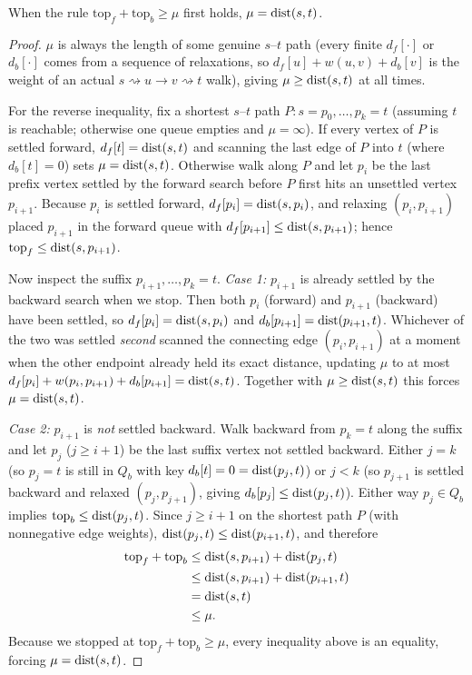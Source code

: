\begin{theorem}
\label{ch08:thm-bidir}
When the rule $\mathrm{top}_f+\mathrm{top}_b\ge\mu$ first holds, $\mu=\operatorname{dist}(s,t)$.
\end{theorem}
\begin{proof}
$\mu$ is always the length of some genuine $s$--$t$ path (every finite $d_f[\cdot]$
or $d_b[\cdot]$ comes from a sequence of relaxations, so $d_f[u]+w(u,v)+d_b[v]$ is
the weight of an actual $s\rightsquigarrow u\to v\rightsquigarrow t$ walk), giving
$\mu\ge\operatorname{dist}(s,t)$ at all times.

For the reverse inequality, fix a shortest $s$--$t$ path
$P: s=p_0,\dots,p_k=t$ (assuming $t$ is reachable; otherwise one queue empties
and $\mu=\infty$). If every vertex of $P$ is settled forward, $d_f[t]=\operatorname{dist}(s,t)$
and scanning the last edge of $P$ into $t$ (where $d_b[t]=0$) sets $\mu=\operatorname{dist}(s,t)$.
Otherwise walk along $P$ and let $p_i$ be the last prefix vertex settled by the
forward search before $P$ first hits an unsettled vertex $p_{i+1}$. Because $p_i$
is settled forward, $d_f[p_i]=\operatorname{dist}(s,p_i)$, and relaxing $(p_i,p_{i+1})$ placed
$p_{i+1}$ in the forward queue with $d_f[p_{i+1}]\le\operatorname{dist}(s,p_{i+1})$; hence
$\mathrm{top}_f\le\operatorname{dist}(s,p_{i+1})$.

Now inspect the suffix $p_{i+1},\dots,p_k=t$.
\emph{Case 1:} $p_{i+1}$ is already settled by the backward search when we stop.
Then both $p_i$ (forward) and $p_{i+1}$ (backward) have been settled, so
$d_f[p_i]=\operatorname{dist}(s,p_i)$ and $d_b[p_{i+1}]=\operatorname{dist}(p_{i+1},t)$. Whichever of the two
was settled \emph{second} scanned the connecting edge $(p_i,p_{i+1})$ at a moment
when the other endpoint already held its exact distance, updating $\mu$ to at most
$d_f[p_i]+w(p_i,p_{i+1})+d_b[p_{i+1}]=\operatorname{dist}(s,t)$. Together with $\mu\ge\operatorname{dist}(s,t)$
this forces $\mu=\operatorname{dist}(s,t)$.

\emph{Case 2:} $p_{i+1}$ is \emph{not} settled backward. Walk backward from $p_k=t$
along the suffix and let $p_j$ ($j\ge i+1$) be the last suffix vertex not settled
backward. Either $j=k$ (so $p_j=t$ is still in $Q_b$ with key $d_b[t]=0=\operatorname{dist}(p_j,t)$)
or $j<k$ (so $p_{j+1}$ is settled backward and relaxed $(p_j,p_{j+1})$, giving
$d_b[p_j]\le\operatorname{dist}(p_j,t)$). Either way $p_j\in Q_b$ implies
$\mathrm{top}_b\le\operatorname{dist}(p_j,t)$. Since $j\ge i+1$ on the shortest path $P$ (with
nonnegative edge weights), $\operatorname{dist}(p_j,t)\le\operatorname{dist}(p_{i+1},t)$, and therefore
\begin{align*}
  \mathrm{top}_f+\mathrm{top}_b
  &\le \operatorname{dist}(s,p_{i+1})+\operatorname{dist}(p_j,t) \\
  &\le \operatorname{dist}(s,p_{i+1})+\operatorname{dist}(p_{i+1},t) \\
  &= \operatorname{dist}(s,t) \\
  &\le \mu.
\end{align*}
Because we stopped at $\mathrm{top}_f+\mathrm{top}_b\ge\mu$, every inequality
above is an equality, forcing $\mu=\operatorname{dist}(s,t)$.
\end{proof}


